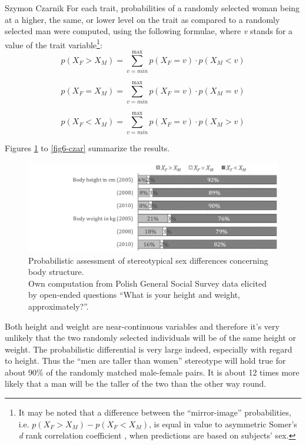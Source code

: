 \begin{artengenv}{Szymon Czarnik}
For each trait, probabilities of a randomly selected woman being at a
higher, the same, or lower level on the trait as compared to a randomly
selected man were computed, using the following formulae, where \emph{v}
stands for a value of the trait variable\footnote{It may be noted that a
  difference between the ``mirror-image'' probabilities, i.e.
  \(p\left( X_{F} > X_{M} \right) - p\left( X_{F} < X_{M} \right)\),
  is equal in value to asymmetric Somer's \textit{d} rank correlation coefficient
  \parencite{somers_new_1962}, when predictions are based on subjects' sex.}:
\[p\left( X_{F} > X_{M} \right) = \sum_{v = min}^{\max}{p\left( X_{F} = v \right) \cdot p\left( X_{M} < v \right)}\]

\[p\left( X_{F} = X_{M} \right) = \sum_{v = min}^{\max}{p\left( X_{F} = v \right) \cdot p\left( X_{M} = v \right)}\]

\[p\left( X_{F} < X_{M} \right) = \sum_{v = min}^{\max}{p\left( X_{F} = v \right) \cdot p\left( X_{M} > v \right)}\]

Figures \ref{fig3-czar} to \ref{fig6-czar} summarize the results.

\begin{figure}[H]
	\centering
   \includegraphics[width=\textwidth]{ART_Czarnik/Czarnik-img019.jpg}
\caption{Probabilistic assessment of stereotypical sex differences concerning body structure.\\
{\footnotesize Own computation from Polish General Social Survey data elicited by open-ended questions
``What is your height and weight, approximately?''}. 
}\label{fig3-czar}
\end{figure}


Both height and weight are near-continuous variables and therefore it's very unlikely that the two randomly selected individuals will be of the same height or weight. The probabilistic differential is very large indeed, especially with regard to height. Thus the ``men are taller than women'' stereotype will hold true for about 90\% of the randomly matched male-female pairs. It is about 12 times more likely that a man will be the taller of the two than the other way round.


\end{artengenv}
